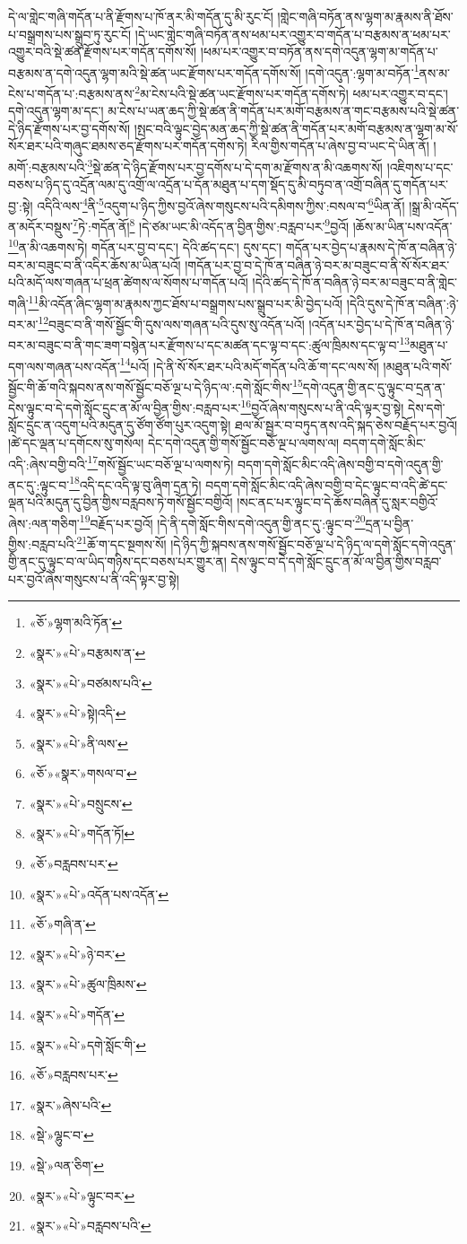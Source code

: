དེ་ལ་གླེང་གཞི་གདོན་པ་ནི་རྫོགས་པ་ཁོ་ནར་མི་གདོན་དུ་མི་རུང་ངོ། །གླེང་གཞི་བཏོན་ནས་ལྷག་མ་རྣམས་ནི་ཐོས་པ་བསྒྲགས་པས་སྒྲུབ་ཏུ་རུང་ངོ། །དེ་ཡང་གླེང་གཞི་བཏོན་ནས་ཕམ་པར་འགྱུར་བ་གདོན་པ་བརྩམས་ན་ཕམ་པར་འགྱུར་བའི་སྡེ་ཚན་རྫོགས་པར་གདོན་དགོས་སོ། །ཕམ་པར་འགྱུར་བ་བཏོན་ནས་དགེ་འདུན་ལྷག་མ་གདོན་པ་བརྩམས་ན་དགེ་འདུན་ལྷག་མའི་སྡེ་ཚན་ཡང་རྫོགས་པར་གདོན་དགོས་སོ། །དགེ་འདུན་:ལྷག་མ་བཏོན་\footnote{«ཅོ་»ལྷག་མའི་ཏོན་}ནས་མ་ངེས་པ་གདོན་པ་:བརྩམས་ནས་\footnote{«སྣར་»«པེ་»བརྩམས་ན་}མ་ངེས་པའི་སྡེ་ཚན་ཡང་རྫོགས་པར་གདོན་དགོས་ཏེ། ཕམ་པར་འགྱུར་བ་དང་། དགེ་འདུན་ལྷག་མ་དང་། མ་ངེས་པ་ཡན་ཆད་ཀྱི་སྡེ་ཚན་ནི་གདོན་པར་མགོ་བརྩམས་ན་གང་བརྩམས་པའི་སྡེ་ཚན་དེ་ཉིད་རྫོགས་པར་བྱ་དགོས་སོ། །སྤང་བའི་ལྟུང་བྱེད་མན་ཆད་ཀྱི་སྡེ་ཚན་ནི་གདོན་པར་མགོ་བརྩམས་ན་ལྷག་མ་སོ་སོར་ཐར་པའི་གཞུང་ཐམས་ཅད་རྫོགས་པར་གདོན་དགོས་ཏེ། རིལ་གྱིས་གདོན་པ་ཞེས་བྱ་བ་ཡང་དེ་ཡིན་ནོ། །མགོ་:བརྩམས་པའི་\footnote{«སྣར་»«པེ་»བཙམས་པའི་}སྡེ་ཚན་དེ་ཉིད་རྫོགས་པར་བྱ་དགོས་པ་དེ་དག་མ་རྫོགས་ན་མི་འཆགས་སོ། །འཇིགས་པ་དང་བཅས་པ་ཉིད་དུ་འདྲོན་ལམ་དུ་འགྲོ་ལ་འདྲོན་པ་དོན་མཐུན་པ་དག་སྡོད་དུ་མི་བཏུབ་ན་འགྲོ་བཞིན་དུ་གདོན་པར་བྱ་:སྟེ། འདིའི་ལས་\footnote{«སྣར་»«པེ་»སྟེ།འདི་}ནི་\footnote{«སྣར་»«པེ་»ནི་ལས་}འདུག་པ་ཉིད་ཀྱིས་བྱའོ་ཞེས་གསུངས་པའི་དམིགས་ཀྱིས་:བསལ་བ་\footnote{«ཅོ་»«སྣར་»གསལ་བ་}ཡིན་ནོ། །སྒྲ་མི་འདོད་ན་མདོར་བསྡུས་\footnote{«སྣར་»«པེ་»བསྲུངས་}ཏེ་:གདོན་ནོ།\footnote{«སྣར་»«པེ་»གདོན་ཏོ།} །དེ་ཙམ་ཡང་མི་འདོད་ན་བྱིན་གྱིས་:བརླབ་པར་\footnote{«ཅོ་»བརླབས་པར་}བྱའོ། །ཆོས་མ་ཡིན་པས་འདོན་\footnote{«སྣར་»«པེ་»འདོན་པས་འདོན་}ན་མི་འཆགས་ཏེ། གདོན་པར་བྱ་བ་དང་། དེའི་ཚད་དང་། དུས་དང་། གདོན་པར་བྱེད་པ་རྣམས་དེ་ཁོ་ན་བཞིན་ཉེ་བར་མ་བཟུང་བ་ནི་འདིར་ཆོས་མ་ཡིན་པའོ། །གདོན་པར་བྱ་བ་དེ་ཁོ་ན་བཞིན་ཉེ་བར་མ་བཟུང་བ་ནི་སོ་སོར་ཐར་པའི་མདོ་ལས་གཞན་པ་ཕྲན་ཚེགས་ལ་སོགས་པ་གདོན་པའོ། །དེའི་ཚད་དེ་ཁོ་ན་བཞིན་ཉེ་བར་མ་བཟུང་བ་ནི་གླེང་གཞི་\footnote{«ཅོ་»གཞི་ན་}མི་འདོན་ཞིང་ལྷག་མ་རྣམས་ཀྱང་ཐོས་པ་བསྒྲགས་པས་སྒྲུབ་པར་མི་བྱེད་པའོ། །དེའི་དུས་དེ་ཁོ་ན་བཞིན་:ཉེ་བར་མ་\footnote{«སྣར་»«པེ་»ཉེ་བར་}བཟུང་བ་ནི་གསོ་སྦྱོང་གི་དུས་ལས་གཞན་པའི་དུས་སུ་འདོན་པའོ། །འདོན་པར་བྱེད་པ་དེ་ཁོ་ན་བཞིན་ཉེ་བར་མ་བཟུང་བ་ནི་གང་ཟག་བསྙེན་པར་རྫོགས་པ་དང་མཚན་དང་ལྟ་བ་དང་:ཚུལ་ཁྲིམས་དང་ལྟ་བ་\footnote{«སྣར་»«པེ་»ཚུལ་ཁྲིམས་}མཐུན་པ་དག་ལས་གཞན་པས་འདོན་\footnote{«སྣར་»«པེ་»གདོན་}པའོ། །དེ་ནི་སོ་སོར་ཐར་པའི་མདོ་གདོན་པའི་ཆོ་ག་དང་ལས་སོ། །མཐུན་པའི་གསོ་སྦྱོང་གི་ཆོ་གའི་སྐབས་ནས་གསོ་སྦྱོང་བཅོ་ལྔ་པ་དེ་ཉིད་ལ་:དགེ་སློང་གིས་\footnote{«སྣར་»«པེ་»དགེ་སློང་གི་}དགེ་འདུན་གྱི་ནང་དུ་ལྟུང་བ་དྲན་ན་དེས་ལྟུང་བ་དེ་དགེ་སློང་དྲུང་ན་མོ་ལ་བྱིན་གྱིས་:བརླབ་པར་\footnote{«ཅོ་»བརླབས་པར་}བྱའོ་ཞེས་གསུངས་པ་ནི་འདི་ལྟར་བྱ་སྟེ། དེས་དགེ་སློང་དྲུང་ན་འདུག་པའི་མདུན་དུ་ཙོག་ཙོག་པུར་འདུག་སྟེ། ཐལ་མོ་སྦྱར་བ་བཏུད་ནས་འདི་སྐད་ཅེས་བརྗོད་པར་བྱའོ། །ཚེ་དང་ལྡན་པ་དགོངས་སུ་གསོལ། དེང་དགེ་འདུན་གྱི་གསོ་སྦྱོང་བཅོ་ལྔ་པ་ལགས་ལ། བདག་དགེ་སློང་མིང་འདི་:ཞེས་བགྱི་བའི་\footnote{«སྣར་»ཞེས་པའི་}གསོ་སྦྱོང་ཡང་བཅོ་ལྔ་པ་ལགས་ཏེ། བདག་དགེ་སློང་མིང་འདི་ཞེས་བགྱི་བ་དགེ་འདུན་གྱི་ནང་དུ་:ལྟུང་བ་\footnote{«སྡེ་»ལྷུང་བ་}འདི་དང་འདི་ལྟ་བུ་ཞིག་དྲན་ཏེ། བདག་དགེ་སློང་མིང་འདི་ཞེས་བགྱི་བ་དེང་ལྟུང་བ་འདི་ཚེ་དང་ལྡན་པའི་མདུན་དུ་བྱིན་གྱིས་བརླབས་ཏེ་གསོ་སྦྱོང་བགྱིའོ། །སང་ནང་པར་ལྟུང་བ་དེ་ཆོས་བཞིན་དུ་སླར་བགྱིའོ་ཞེས་:ལན་གཅིག་\footnote{«སྡེ་»ལན་ཅིག་}བརྗོད་པར་བྱའོ། །དེ་ནི་དགེ་སློང་གིས་དགེ་འདུན་གྱི་ནང་དུ་:ལྟུང་བ་\footnote{«སྣར་»«པེ་»ལྟུང་བར་}དྲན་པ་བྱིན་གྱིས་:བརླབ་པའི་\footnote{«སྣར་»«པེ་»བརླབས་པའི་}ཆོ་ག་དང་སྔགས་སོ། །དེ་ཉིད་ཀྱི་སྐབས་ནས་གསོ་སྦྱོང་བཅོ་ལྔ་པ་དེ་ཉིད་ལ་དགེ་སློང་དགེ་འདུན་གྱི་ནང་དུ་ལྟུང་བ་ལ་ཡིད་གཉིས་དང་བཅས་པར་གྱུར་ན། དེས་ལྟུང་བ་དེ་དགེ་སློང་དྲུང་ན་མོ་ལ་བྱིན་གྱིས་བརླབ་པར་བྱའོ་ཞེས་གསུངས་པ་ནི་འདི་ལྟར་བྱ་སྟེ། 
